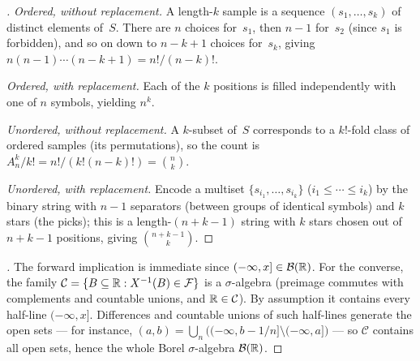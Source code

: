 \begin{proof}[]
\emph{Ordered, without replacement.} A length-$k$ sample is a
sequence $(s_1, \dots, s_k)$ of distinct elements of~$S$. There are
$n$ choices for~$s_1$, then $n - 1$ for~$s_2$ (since $s_1$ is
forbidden), and so on down to $n - k + 1$ choices for~$s_k$, giving
$n(n-1)\cdots(n-k+1) = n!/(n-k)!$.

\emph{Ordered, with replacement.} Each of the $k$ positions is filled
independently with one of $n$ symbols, yielding $n^k$.

\emph{Unordered, without replacement.} A $k$-subset of~$S$ corresponds
to a $k!$-fold class of ordered samples (its permutations), so the
count is $A_n^k / k! = n! / (k!(n-k)!) = \binom{n}{k}$.

\emph{Unordered, with replacement.} Encode a multiset
$\{s_{i_1}, \dots, s_{i_k}\}$ ($i_1 \leq \cdots \leq i_k$) by the
binary string with $n - 1$ separators (between groups of identical
symbols) and $k$ stars (the picks); this is a length-$(n + k - 1)$
string with $k$ stars chosen out of $n + k - 1$ positions, giving
$\binom{n+k-1}{k}$.
\end{proof}

\begin{proof}[]
The forward implication is immediate since $(-\infty, x] \in \mathcal{B}(\mathbb{R})$.
For the converse, the family
$\mathcal{C} = \{B \subseteq \mathbb{R} : X^{-1}(B) \in \mathcal{F}\}$ is a
$\sigma$-algebra (preimage commutes with complements and countable
unions, and $\mathbb{R} \in \mathcal{C}$). By assumption it contains every
half-line $(-\infty, x]$. Differences and countable unions of such
half-lines generate the open sets — for instance,
$(a, b) = \bigcup_{n} \bigl((-\infty, b - 1/n] \setminus (-\infty, a]\bigr)$
— so $\mathcal{C}$ contains all open sets, hence the whole Borel
$\sigma$-algebra $\mathcal{B}(\mathbb{R})$.
\end{proof}

